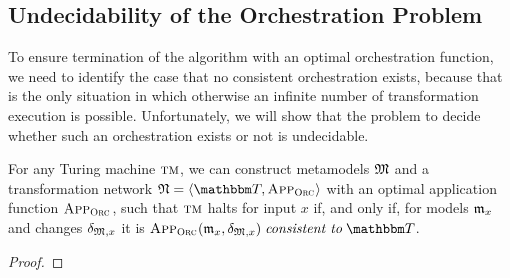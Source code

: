 \subsection{Undecidability of the Orchestration Problem} %

To ensure termination of the  algorithm with an optimal orchestration function, we need to identify the case that no consistent orchestration exists, because that is the only situation in which otherwise an infinite number of transformation execution is possible.
Unfortunately, we will show that the problem to decide whether such an orchestration exists or not is undecidable.


\begin{lemma}
    \label{lemma:networkfromturingmachine}
    For any Turing machine $\textsc{tm}$, we can construct metamodels $\mathfrak{M}$ and a transformation network $\transformationnetwork{N} = \tupled{\transformationset{T}, \appfunction{\orcfunction{}}}$ with an optimal application function $\textsc{App}_{\textsc{Orc}_{}}$, such that $\textsc{tm}$ halts for input $x$ if, and only if, for models $\mathfrak{m}_{x}$ and changes $\mathfrak{\delta}_{\mathfrak{M},x}$ it is $\appfunction{\orcfunction{}}(\modeltuple{m}_{x}, \changetuple{\metamodeltuple{M},x}) \consistenttomath \transformationset{T}$.
\end{lemma}
\begin{proof}
\end{proof}

